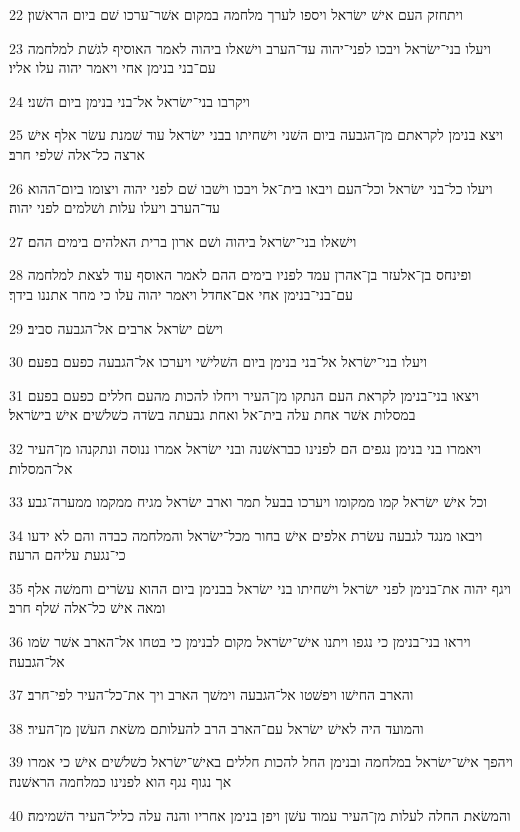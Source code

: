 \par 22 ויתחזק העם אישׁ ישׂראל ויספו לערך מלחמה במקום אשׁר־ערכו שׁם ביום הראשׁון׃
\par 23 ויעלו בני־ישׂראל ויבכו לפני־יהוה עד־הערב וישׁאלו ביהוה לאמר האוסיף לגשׁת למלחמה עם־בני בנימן אחי ויאמר יהוה עלו אליו׃
\par 24 ויקרבו בני־ישׂראל אל־בני בנימן ביום השׁני׃
\par 25 ויצא בנימן לקראתם מן־הגבעה ביום השׁני וישׁחיתו בבני ישׂראל עוד שׁמנת עשׂר אלף אישׁ ארצה כל־אלה שׁלפי חרב׃
\par 26 ויעלו כל־בני ישׂראל וכל־העם ויבאו בית־אל ויבכו וישׁבו שׁם לפני יהוה ויצומו ביום־ההוא עד־הערב ויעלו עלות ושׁלמים לפני יהוה׃
\par 27 וישׁאלו בני־ישׂראל ביהוה ושׁם ארון ברית האלהים בימים ההם׃
\par 28 ופינחס בן־אלעזר בן־אהרן עמד לפניו בימים ההם לאמר האוסף עוד לצאת למלחמה עם־בני־בנימן אחי אם־אחדל ויאמר יהוה עלו כי מחר אתננו בידך׃
\par 29 וישׂם ישׂראל ארבים אל־הגבעה סביב׃
\par 30 ויעלו בני־ישׂראל אל־בני בנימן ביום השׁלישׁי ויערכו אל־הגבעה כפעם בפעם׃
\par 31 ויצאו בני־בנימן לקראת העם הנתקו מן־העיר ויחלו להכות מהעם חללים כפעם בפעם במסלות אשׁר אחת עלה בית־אל ואחת גבעתה בשׂדה כשׁלשׁים אישׁ בישׂראל׃
\par 32 ויאמרו בני בנימן נגפים הם לפנינו כבראשׁנה ובני ישׂראל אמרו ננוסה ונתקנהו מן־העיר אל־המסלות׃
\par 33 וכל אישׁ ישׂראל קמו ממקומו ויערכו בבעל תמר וארב ישׂראל מגיח ממקמו ממערה־גבע׃
\par 34 ויבאו מנגד לגבעה עשׂרת אלפים אישׁ בחור מכל־ישׂראל והמלחמה כבדה והם לא ידעו כי־נגעת עליהם הרעה׃
\par 35 ויגף יהוה את־בנימן לפני ישׂראל וישׁחיתו בני ישׂראל בבנימן ביום ההוא עשׂרים וחמשׁה אלף ומאה אישׁ כל־אלה שׁלף חרב׃
\par 36 ויראו בני־בנימן כי נגפו ויתנו אישׁ־ישׂראל מקום לבנימן כי בטחו אל־הארב אשׁר שׂמו אל־הגבעה׃
\par 37 והארב החישׁו ויפשׁטו אל־הגבעה וימשׁך הארב ויך את־כל־העיר לפי־חרב׃
\par 38 והמועד היה לאישׁ ישׂראל עם־הארב הרב להעלותם משׂאת העשׁן מן־העיר׃
\par 39 ויהפך אישׁ־ישׂראל במלחמה ובנימן החל להכות חללים באישׁ־ישׂראל כשׁלשׁים אישׁ כי אמרו אך נגוף נגף הוא לפנינו כמלחמה הראשׁנה׃
\par 40 והמשׂאת החלה לעלות מן־העיר עמוד עשׁן ויפן בנימן אחריו והנה עלה כליל־העיר השׁמימה׃
